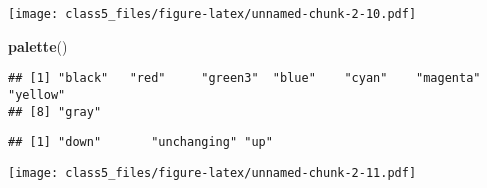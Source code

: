 \documentclass[]{article}
\newenvironment{Shaded}{\begin{snugshade}}{\end{snugshade}}
\newcommand{\KeywordTok}[1]{\textcolor[rgb]{0.13,0.29,0.53}{\textbf{#1}}}
\newcommand{\DataTypeTok}[1]{\textcolor[rgb]{0.13,0.29,0.53}{#1}}
\newcommand{\StringTok}[1]{\textcolor[rgb]{0.31,0.60,0.02}{#1}}
\newcommand{\OperatorTok}[1]{\textcolor[rgb]{0.81,0.36,0.00}{\textbf{#1}}}
\newcommand{\NormalTok}[1]{#1}
\begin{document}
\texttt{[image: class5\_files/figure-latex/unnamed-chunk-2-10.pdf]}

\begin{Shaded}
\begin{Highlighting}[]
\KeywordTok{palette}\NormalTok{()}
\end{Highlighting}
\end{Shaded}

\begin{verbatim}
## [1] "black"   "red"     "green3"  "blue"    "cyan"    "magenta" "yellow" 
## [8] "gray"
\end{verbatim}

\begin{Shaded}
\end{Shaded}

\begin{verbatim}
## [1] "down"       "unchanging" "up"
\end{verbatim}

\begin{Shaded}
\end{Shaded}

\texttt{[image: class5\_files/figure-latex/unnamed-chunk-2-11.pdf]}
\end{document}
